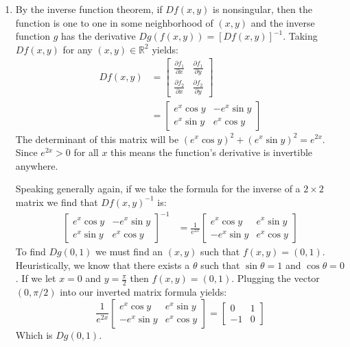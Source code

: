 \documentclass[letterpaper,10pt]{article}
\begin{document}
\begin{enumerate}
\begin{enumerate}
		\item By the inverse function theorem, if $Df(x,y)$ is nonsingular, then the function is one to one in some neighborhood of $(x,y)$ and the inverse function $g$ has the derivative $Dg(f(x,y)) = [Df(x,y)]^{-1}$. Taking $Df(x,y)$ for any $(x, y) \in \mathbb{R}^2$ yields:
		\begin{align*}
		Df(x,y) & =  \left[ \begin{matrix}
			\frac{\partial  f_1}{\partial x} & \frac{\partial  f_1}{\partial y}  \\
			\frac{\partial  f_2}{\partial x} & \frac{\partial  f_2}{\partial y} 
	 \end{matrix} \right] \\
		& =  \left[ \begin{matrix}
		e^x \cos y & -e^x \sin y \\
		e^x \sin y & e^x \cos y
	 \end{matrix} \right]
	 \end{align*}
	 The determinant of this matrix will be $(e^x \cos y)^2 + (e^x \sin y)^2 = e^{2x}$. Since $e^{2x} > 0$ for all $x$ this means the function's derivative is invertible anywhere.

	 Speaking generally again, if we take the formula for the inverse of a $2 \times 2$ matrix we find that $Df(x,y)^{-1}$ is:
		\begin{align*}
		\left[ \begin{matrix}
		e^x \cos y & -e^x \sin y \\
		e^x \sin y & e^x \cos y
	 \end{matrix} \right]^{-1} &=
		\frac{1}{e^{2x}} \left[ \begin{matrix}
		e^x \cos y & e^x \sin y \\
		-e^x \sin y & e^x \cos y
	 \end{matrix} \right] 
	 \end{align*}
	 To find $Dg(0,1)$ we must find an $(x, y)$ such that $f(x,y) = (0,1)$. Heuristically, we know that there exists a $\theta$ such that $\sin \theta = 1$ and $\cos \theta = 0$. If we let $x = 0$ and $y = \frac{\pi}{2}$ then $f(x,y) = (0, 1)$. Plugging the vector $(0, \pi/2)$ into our inverted matrix formula yields:
	 $$\frac{1}{e^{2x}}\left[ \begin{matrix}
		e^x \cos y & e^x \sin y \\
		-e^x \sin y & e^x \cos y
	 \end{matrix} \right] = 
	 \left[	\begin{matrix} 
	  0 & 1 \\
		-1 & 0
	 \end{matrix} \right] 
	  $$
	  Which is $Dg(0,1)$.
	\end{enumerate}


\end{enumerate}
\end{document}
